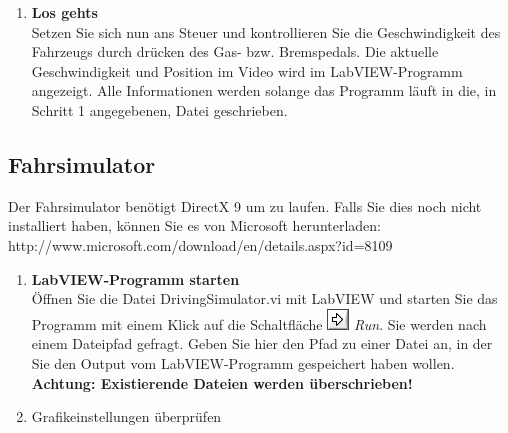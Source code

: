 \begin{enumerate}[label=\arabic*.]
\item \textbf{Los gehts}\\
Setzen Sie sich nun ans Steuer und kontrollieren Sie die Geschwindigkeit des Fahrzeugs durch drücken des Gas- bzw. Bremspedals. Die aktuelle Geschwindigkeit und Position im Video wird im LabVIEW-Programm angezeigt. Alle Informationen werden solange das Programm läuft in die, in Schritt 1 angegebenen, Datei geschrieben.
	
\end{enumerate}

\subsection{Fahrsimulator}
Der Fahrsimulator benötigt DirectX 9 um zu laufen. Falls Sie dies noch nicht installiert haben, können Sie es von Microsoft herunterladen: http://www.microsoft.com/download/en/details.aspx?id=8109

\begin{enumerate}[label=\arabic*.]

\item \textbf{LabVIEW-Programm starten}\\
Öffnen Sie die Datei DrivingSimulator.vi mit LabVIEW und starten Sie das Programm mit einem Klick auf die Schaltfläche \includegraphics[height=\ht\strutbox]{src/icon_labview_run.png} \textit{Run}. Sie werden nach einem Dateipfad gefragt. Geben Sie hier den Pfad zu einer Datei an, in der Sie den Output vom LabVIEW-Programm gespeichert haben wollen. \textbf{Achtung: Existierende Dateien werden überschrieben!}

\item Grafikeinstellungen überprüfen

\end{enumerate}
